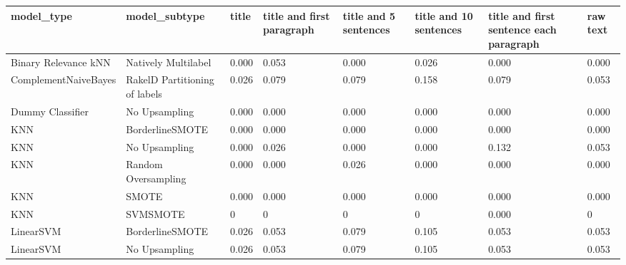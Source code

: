 \begin{tabular}{llllllll}
\toprule
                     model\_type &                 model\_subtype & title & title and first paragraph & title and 5 sentences & title and 10 sentences & title and first sentence each paragraph & raw text \\
\midrule
           Binary Relevance kNN &           Natively Multilabel & 0.000 &                     0.053 &                 0.000 &                  0.026 &                                   0.000 &    0.000 \\
           ComplementNaiveBayes & RakelD Partitioning of labels & 0.026 &                     0.079 &                 0.079 &                  0.158 &                                   0.079 &    0.053 \\
               Dummy Classifier &                 No Upsampling & 0.000 &                     0.000 &                 0.000 &                  0.000 &                                   0.000 &    0.000 \\
                            KNN &               BorderlineSMOTE & 0.000 &                     0.000 &                 0.000 &                  0.000 &                                   0.000 &    0.000 \\
                            KNN &                 No Upsampling & 0.000 &                     0.026 &                 0.000 &                  0.000 &                                   0.132 &    0.053 \\
                            KNN &           Random Oversampling & 0.000 &                     0.000 &                 0.026 &                  0.000 &                                   0.000 &    0.000 \\
                            KNN &                         SMOTE & 0.000 &                     0.000 &                 0.000 &                  0.000 &                                   0.000 &    0.000 \\
                            KNN &                      SVMSMOTE &     0 &                         0 &                     0 &                      0 &                                   0.000 &        0 \\
                      LinearSVM &               BorderlineSMOTE & 0.026 &                     0.053 &                 0.079 &                  0.105 &                                   0.053 &    0.053 \\
                      LinearSVM &                 No Upsampling & 0.026 &                     0.053 &                 0.079 &                  0.105 &                                   0.053 &    0.053 \\

\end{tabular}
